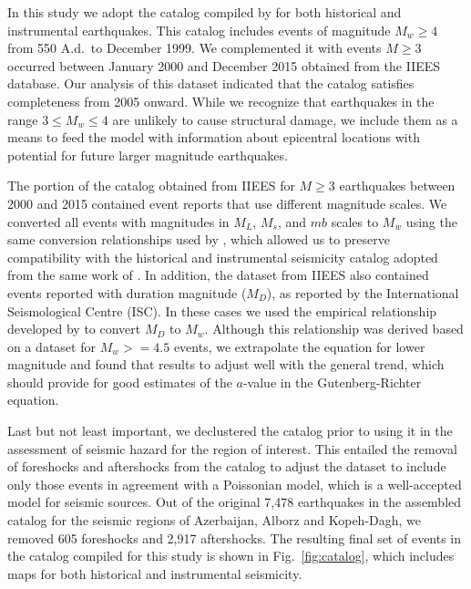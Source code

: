 In this study we adopt the catalog compiled by \citet{Zare2014} for both historical and instrumental earthquakes. This catalog includes events of magnitude $M_w \geq 4$ from 550 A.d.~to December 1999. We complemented it with events $M \geq 3$ occurred between January 2000 and December 2015 obtained from the IIEES database. Our analysis of this dataset indicated that the catalog satisfies completeness from 2005 onward. While we recognize that earthquakes in the range $3 \leq M_w \leq 4$ are unlikely to cause structural damage, we include them as a means to feed the model with information about epicentral locations with potential for future larger magnitude earthquakes. 








The portion of the catalog obtained from IIEES for $M \geq 3$ earthquakes between 2000 and 2015 contained event reports that use different magnitude scales. We converted all events with magnitudes in $M_L$, $M_s$, and $mb$ scales to $M_w$ using the same conversion relationships used by \citet{Zare2014}, which allowed us to preserve compatibility with the historical and instrumental seismicity catalog adopted from the same work of \citet{Zare2014}. In addition, the dataset from IIEES also contained events reported with duration magnitude ($M_D$), as reported by the International Seismological Centre (ISC). In these cases we used the empirical relationship developed by \citet{Deniz2010} to convert $M_D$ to $M_w$. Although this relationship was derived based on a dataset for $M_w>=4.5$ events, we extrapolate the equation for lower magnitude and found that results to adjust well with the general trend, which should provide for good estimates of the $a$-value in the Gutenberg-Richter equation.

Last but not least important, we declustered the catalog prior to using it in the assessment of seismic hazard for the region of interest. This entailed the removal of foreshocks and aftershocks from the catalog to adjust the dataset to include only those events in agreement with a Poissonian model, which is a well-accepted model for seismic sources. Out of the original 7,478 earthquakes in the assembled catalog for the seismic regions of Azerbaijan, Alborz and Kopeh-Dagh, we removed 605 foreshocks and 2,917 aftershocks. The resulting final set of events in the catalog compiled for this study is shown in Fig.~\ref{fig:catalog}, which includes maps for both historical and instrumental seismicity.


